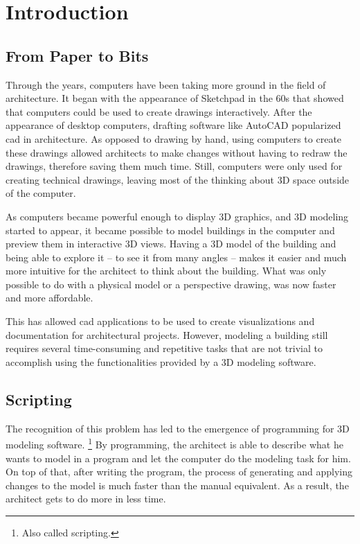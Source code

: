 
\chapter{Introduction}
\label{chapter:introduction}


\section{From Paper to Bits}

Through the years, computers have been taking more ground in the field of architecture.
It began with the appearance of Sketchpad\cite{Sutherland:1964:SPM:800265.810742} in the 60s that showed that computers could be used to create drawings interactively.
After the appearance of desktop computers, drafting software like AutoCAD popularized \gls{cad} in architecture.
As opposed to drawing by hand, using computers to create these drawings allowed architects to make changes without having to redraw the drawings, therefore saving them much time.
Still, computers were only used for creating technical drawings, leaving most of the thinking about 3D space outside of the computer.

As computers became powerful enough to display 3D graphics, and 3D modeling started to appear, it became possible to model buildings in the computer and preview them in interactive 3D views.
Having a 3D model of the building and being able to explore it -- to see it from many angles -- makes it easier and much more intuitive for the architect to think about the building.
What was only possible to do with a physical model or a perspective drawing, was now faster and more affordable.

This has allowed \gls{cad} applications to be used to create visualizations and documentation for architectural projects.
However, modeling a building still requires several time-consuming and repetitive tasks that are not trivial to accomplish using the functionalities provided by a 3D modeling software.


\section{Scripting}
The recognition of this problem has led to the emergence of programming for 3D modeling software.%
\footnote{Also called scripting.}
By programming, the architect is able to describe what he wants to model in a program and let the computer do the modeling task for him.
On top of that, after writing the program, the process of generating and applying changes to the model is much faster than the manual equivalent.
As a result, the architect gets to do more in less time.

